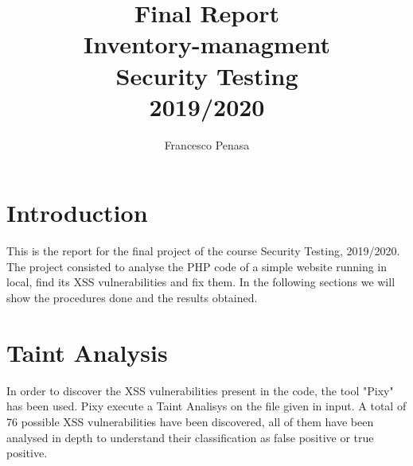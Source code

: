 \documentclass[11pt]{article}
\begin{document}
\author{Francesco Penasa}
\title{Final Report \\Inventory-managment \\Security Testing \\2019/2020}
\maketitle

\medskip

\section{Introduction}
This is the report for the final project of the course Security Testing, 2019/2020. The project consisted to analyse the PHP code of a simple website running in local, find its XSS vulnerabilities and  fix them. In the following sections we will show the procedures done and the results obtained.


\section{Taint Analysis}
In order to discover the XSS vulnerabilities present in the code, the tool "Pixy" has been used. Pixy execute a Taint Analisys on the file given in input. A total of 76 possible XSS vulnerabilities have been discovered, all of them have been analysed in depth to understand their classification as false positive or true positive.
\end{document}
